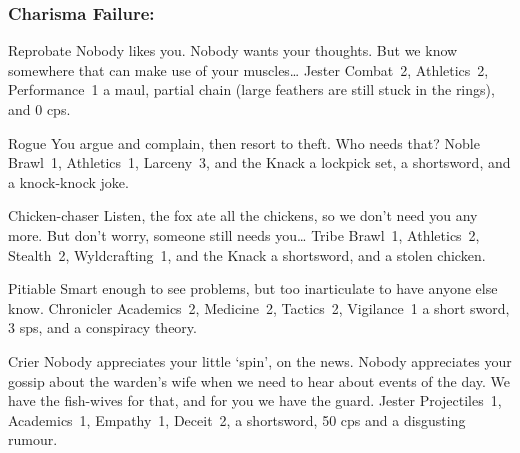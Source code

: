 \begin{multicols}{2}
\begin{itemize}
\end{itemize}

\needspace{10em}
\subsubsection{Charisma Failure:}

\begin{itemize}

  {Reprobate}%
  {Nobody likes you.
  Nobody wants your thoughts.
  But we know somewhere that can make use of your muscles\ldots
  }%
  {Jester}%
  {Combat~2, Athletics~2, Performance~1}%
  {a maul, partial chain (large feathers are still stuck in the rings), and 0 \glspl{cp}.}%

  {Rogue}%
  {You argue and complain, then resort to theft.
  Who needs that?
  }%
  {Noble}%
  {Brawl~1, Athletics~1, Larceny~3, and the Knack \lucky}%
  {a lockpick set, a shortsword, and a knock-knock joke.}%

  {Chicken-chaser}%
  {Listen, the fox ate all the chickens, so we don't need you any more.
  But don't worry, someone still needs you\ldots
  }%
  {Tribe}%
  {Brawl~1, Athletics~2, Stealth~2, Wyldcrafting~1, and the Knack \lucky}%
  {a shortsword, and a stolen chicken.}%

  {Pitiable}%
  {Smart enough to see problems, but too inarticulate to have anyone else know.
  }%
  {Chronicler}%
  {Academics~2, Medicine~2, Tactics~2, Vigilance~1}%
  {a short sword, 3 \glspl{sp}, and a conspiracy theory.}%

  {Crier}%
  {Nobody appreciates your little `spin', on the news.
  Nobody appreciates your gossip about the warden's wife when we need to hear about events of the day.
  We have the fish-wives for that, and for you we have the \gls{guard}.
  }%
  {Jester}%
  {Projectiles~1, Academics~1, Empathy~1, Deceit~2, }%
  {a shortsword, 50 \glspl{cp} and a disgusting rumour.}%

\end{itemize}

\commonArmourChart

\commonWeaponsChart %
\label{commonWeapons}

\end{multicols}

